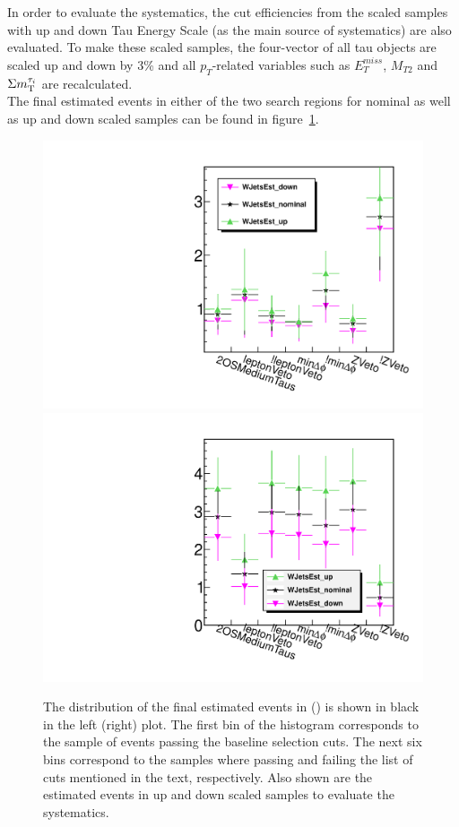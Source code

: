 In order to evaluate the systematics, the cut efficiencies from the scaled samples with 
up and down Tau Energy Scale (as the main source of systematics) are also evaluated.
To make these scaled samples, the four-vector of all tau objects 
are scaled up and down by 3\% and all $p_T$-related variables such as $E_T^{miss}$, $M_{T2}$ and $\Sigma m_{\rm T}^{\tau_i}$ are recalculated.\\
The final estimated \wjets events in either of the two search regions for nominal as well as up and down scaled samples 
can be found in figure~\ref{fig:wjets_1}.  
\begin{figure}[!Hhtb]
\centering
\includegraphics[angle=0,scale=0.35]{TauTauFigs/WJets_bin1.pdf}
\includegraphics[angle=0,scale=0.35]{TauTauFigs/WJets_binII.pdf}\\
\caption{The distribution of the final estimated \wjets events in \binone (\bintwo) is shown in black in the left (right) plot. 
 The first bin of the histogram corresponds to the sample of events passing the baseline selection cuts. 
The next six bins correspond to the samples where passing and failing the 
list of cuts mentioned in the text, respectively. Also shown are the estimated \wjets events in up and down scaled samples to evaluate the systematics.}
\label{fig:wjets_1}
\end{figure}

